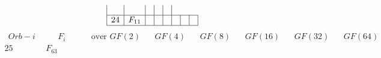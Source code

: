 \documentclass{article}
\begin{document}
{$$\begin{array}{|r|*{7}{r|}}
 & 
 & 
 & 
 & 
\\
\hline
24 
 &F_{11}  &
 & 
 & 
 & 
 & 
 & 
\\
\hline
\end{array}
$$
$$
\begin{array}{|r|*{7}{r|}}
\hline
\ \ Orb-i \ \ &\ \ \quad F_i \quad \ \  &\ \ \text{ over }GF(2)\ \ &\ \ GF(4)\ \ &\ \ GF(8)\ \ &\ \ GF(16)\ \ &\ \ GF(32)\ \ &\ \ GF(64)\ \ \\
\hline
25 
 & F_{63} &
 & 
 & 
 & 

\end{array}$$}
\end{document}
